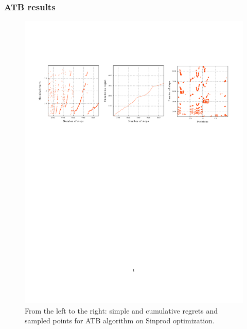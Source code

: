 \documentclass[xcolor={usenames,dvipsnames}]{beamer}
\begin{document}
\begin{frame}
\frametitle{ATB results}
\begin{figure}
\hspace*{-0.2cm}
\includegraphics[trim={1.1cm 6cm 1cm 4cm},clip,scale = 0.64]{ATB.pdf}
\vspace*{-7cm}
\caption{\label{fig:atb}From the left to the right: simple and cumulative regrets and sampled points for ATB algorithm on Sinprod optimization.}
\end{figure}
\end{frame}
\begin{frame}
	\small{

{}
\nocite{*}
}
\label{lastpage}
\end{frame}
\end{document}
